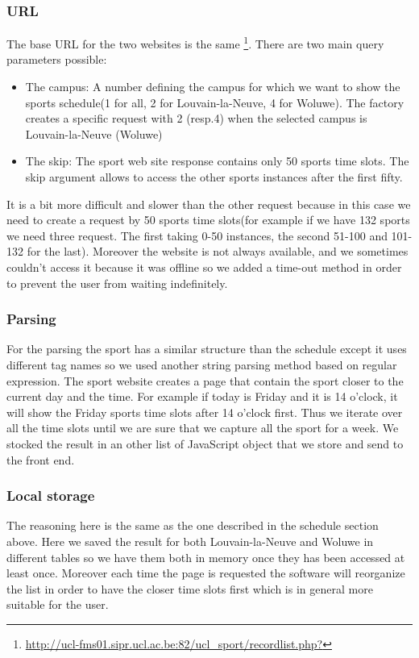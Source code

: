 \documentclass{eplmastersthesis}
\begin{document}
\subsubsection{URL}
The base URL for the two websites is the same \footnote{\url{http://ucl-fms01.sipr.ucl.ac.be:82/ucl_sport/recordlist.php?}}. There are two main query parameters possible:
\begin{itemize}
\item The campus: A number defining the campus for which we want to show the sports schedule(1 for all, 2 for Louvain-la-Neuve, 4 for Woluwe). The factory creates a specific request with 2 (resp.4) when the selected campus is Louvain-la-Neuve (Woluwe)
\item The skip: The sport web site response contains only 50 sports time slots. The skip argument allows to access the other sports instances after the first fifty.
\end{itemize}
It is a bit more difficult and slower than the other request because in this case we need to create a request by 50 sports time slots(for example if we have 132 sports we need three request. The first taking 0-50 instances, the second 51-100 and 101-132 for the last). Moreover the website is not always available, and we sometimes couldn't access it because it was offline so we added a time-out method in order to prevent the user from waiting indefinitely.
\subsubsection{Parsing}
For the parsing the sport has a similar structure than the schedule except it uses different tag names so we used another string parsing method based on regular expression. The sport website creates a page that contain the sport closer to the current day and the time. For example if today is Friday and it is 14 o'clock, it will show the Friday sports time slots after 14 o'clock first. Thus we iterate over all the time slots until we are sure that we capture all the sport for a week. We stocked the result in an other list of JavaScript object that we store and send to the front end.
\subsubsection{Local storage}
The reasoning here is the same as the one described in the schedule section above. Here we saved the result for both Louvain-la-Neuve and Woluwe in different tables so we have them both in memory once they has been accessed at least once. Moreover each time the page is requested the software will reorganize the list in order to have the closer time slots first which is in general more suitable for the user. 
\end{document}
